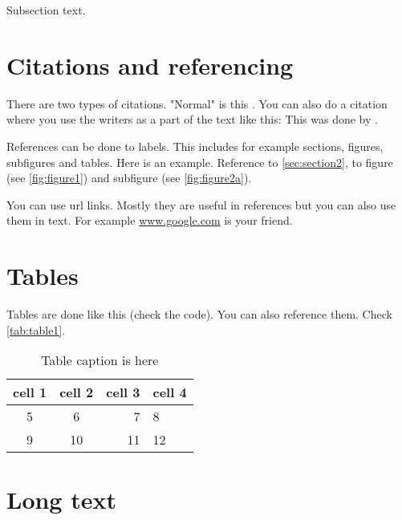 \documentclass[11pt,a4paper,twoside]{article}
\begin{document}
Subsection text.


\section{Citations and referencing}

There are two types of citations. "Normal" is this \citep{Tarot1986}. You can also do a citation where you use the writers as a part of the text like this: This was done by \citet{Tarot1986}.

References can be done to labels. This includes for example sections, figures, subfigures and tables. Here is an example. Reference to \autoref{sec:section2}, to figure (see \autoref{fig:figure1}) and subfigure (see \autoref{fig:figure2a}).

You can use url links. Mostly they are useful in references but you can also use them in text. For example \url{www.google.com} is your friend.

\section{Tables}

Tables are done like this (check the code). You can also reference them. Check \autoref{tab:table1}.

\begin{table}[htd]
\caption{Table caption is here}
\begin{center}
\begin{tabular}{ccrl}		%
\toprule	%
cell 1 & cell 2 & cell 3 & cell 4\\	%
\midrule	%
5 & 6 & 7 & 8 \\
9 & 10 & 11 & 12 \\
\bottomrule	 %
\end{tabular}
\end{center}
\label{tab:table1}
\end{table}


\section{Long text}
\end{document}
